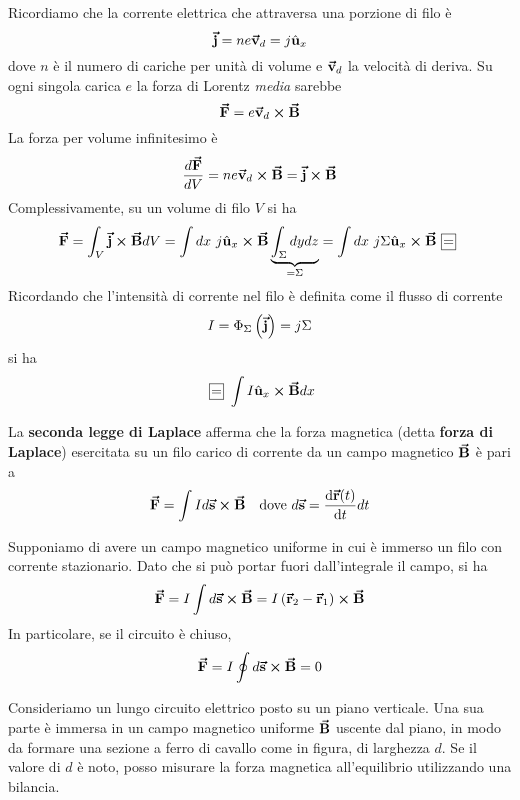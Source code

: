 Ricordiamo che la corrente elettrica che attraversa una porzione di filo è
\begin{equation*}
	\vb*{\va{j}}=ne\vb*{\va{v}}_d=j\hat{\mathbf{u}}_x
\end{equation*}
dove $n$ è il numero di cariche per unità di volume e $\vb*{\va{v}}_d$ la velocità di deriva. Su ogni singola carica $e$ la forza di Lorentz \textit{media} sarebbe
\begin{equation*}
	\vb*{\va{F}}=e\vb*{\va{v}}_d\cross\vb*{\va{B}}
\end{equation*}
La forza per volume infinitesimo è
\begin{equation*}
	\frac{d\vb*{\va{F}}}{dV}=ne\vb*{\va{v}}_d\cross\vb*{\va{B}}=\vb*{\va{j}}\cross\vb*{\va{B}}
\end{equation*}
Complessivamente, su un volume di filo $V$ si ha
\begin{equation}
	\vba{F}=\int_V\vba{j}\cross\vba{B}dV=\int dx\ j\vbh{u}_x\cross\vba{B}\underbrace{\int_{\Sigma}dydz}_{=\Sigma}=\int dx\ j\Sigma \vbh{u}_x\cross\vba{B}\squarequal
\end{equation}
Ricordando che l'intensità di corrente nel filo è definita come il flusso di corrente
\begin{equation*}
	I=\Phi_{\Sigma}\left(\vb*{\va{j}}\right)=j\Sigma
\end{equation*}
si ha
\begin{equation*}
	\squarequal\int I\vbh{u}_x\cross\vba{B}dx
\end{equation*}
\begin{define}
	La \textbf{seconda legge di Laplace} afferma che la forza magnetica (detta \textbf{forza di Laplace}) esercitata su un filo carico di corrente da un campo magnetico $\vb*{\va{B}}$ è pari a
	\begin{align}
		\vba{F}=\int I d\vba{s}\cross\vba{B}&& \text{dove}\ d\vba{s}=\dv{\vba{r}(t)}{t}dt
	\end{align}
\end{define}
\begin{example}\label{RisultateSpiraNulla}
	Supponiamo di avere un campo magnetico uniforme in cui è immerso un filo con corrente stazionario. Dato che si può portar fuori dall'integrale il campo, si ha
	\begin{equation}
		\vb*{\va{F}}=I\int d\vb*{\va{s}}\cross\vb*{\va{B}}=I\left(\vb*{\va{r}}_2-\vb*{\va{r}}_1\right)\cross\vb*{\va{B}}
	\end{equation}
In particolare, se il circuito è chiuso,
\begin{equation}
	\vb*{\va{F}}=I\oint d\vb*{\va{s}}\cross\vb*{\va{B}}=0
\end{equation}
\end{example}
\begin{example}
	Consideriamo un lungo circuito elettrico posto su un piano verticale. Una sua parte è immersa in un campo magnetico uniforme $\vb*{\va{B}}$ uscente dal piano, in modo da formare una sezione a ferro di cavallo come in figura, di larghezza $d$.
	Se il valore di $d$ è noto, posso misurare la forza magnetica all'equilibrio utilizzando una bilancia.
\end{example}
